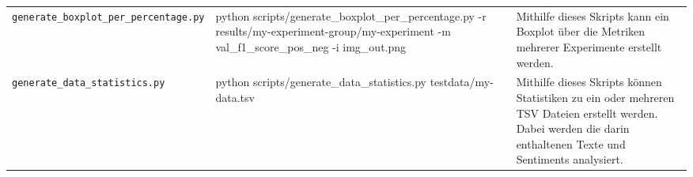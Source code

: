 \begin{appendices}
\begin{table}[H]
\begin{adjustbox}{max width=\textwidth}
\begin{tabularx}{\textwidth}{|l|l|X|}
      \texttt{generate{\_}boxplot{\_}per{\_}percentage.py} & python scripts/generate{\_}boxplot{\_}per{\_}percentage.py -r results/my-experiment-group/my-experiment -m val{\_}f1{\_}score{\_}pos{\_}neg -i img{\_}out.png & Mithilfe dieses Skripts kann ein Boxplot über die Metriken mehrerer Experimente erstellt werden.\\
      \texttt{generate{\_}data{\_}statistics.py} & python scripts/generate{\_}data{\_}statistics.py testdata/my-data.tsv & Mithilfe dieses Skripts können Statistiken zu ein oder mehreren TSV Dateien erstellt werden. Dabei werden die darin enthaltenen Texte und Sentiments analysiert.\\

\end{tabularx}
\end{adjustbox}
\end{table}
\end{appendices}
